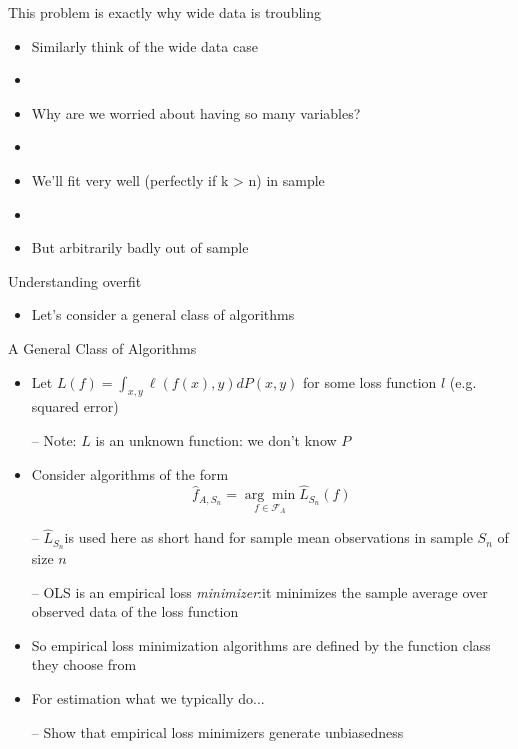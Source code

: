 \documentclass{beamer}
\begin{document}
\begin{frame}{This problem is exactly why wide data is troubling}
	\begin{itemize}
		\item Similarly think of the wide data case
		\item[]
		\item Why are we worried about having so many variables?
		\item[]
		\item We’ll fit very well (perfectly if k > n) in sample
		\item[]
		\item But arbitrarily badly out of sample
	\end{itemize}
\end{frame}

\begin{frame}{Understanding overfit}
	\begin{itemize}
		\item Let’s consider a general class of algorithms
	\end{itemize}
\end{frame}

\begin{frame}{A General Class of Algorithms}
	\begin{itemize}
		\item Let $L(f)=\int_{x,y}\ell(f(x),y)dP(x,y)$ for some loss function $l$ (e.g. squared error)
		
		– Note: $L$ is an unknown function: we don’t know $P$
		
		\item Consider algorithms of the form
		$$\hat{f}_{A,S_n}=\underset{f \in \mathcal{F}_A}{\arg\min}\hat{L}_{S_n}(f)$$
		
		– $\hat{L}_{S_n}$is used here as short hand for sample mean observations in sample $S_n$ of size $n$
		
		– OLS is an empirical loss \textit{minimizer}:it minimizes the sample average over observed data of the loss function
		
		\item So empirical loss minimization algorithms are defined by the function class they choose from
		
		\item For estimation what we typically do...
		
		– Show that empirical loss minimizers generate unbiasedness
	\end{itemize}
\end{frame}
\end{document}
